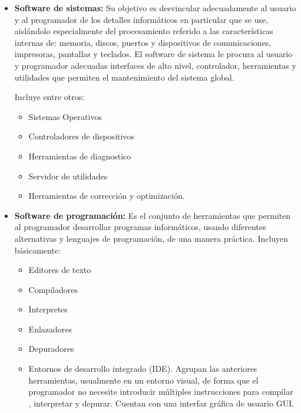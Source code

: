 \documentclass[12pt]{book} %
\begin{document}
	
		\begin{itemize}
			\item \textbf{Software de sistemas:} Su objetivo es desvincular adecuadamente al usuario y al programador de los detalles
			informáticos en particular que se use, aislándolo especialmente del procesamiento referido a las características internas de:
			memoria, discos, puertos y dispositivos de comunicaciones, impresoras, pantallas y teclados. El software de sistema le procura
			al usuario y programador adecuadas interfaces de alto nivel, controlador, herramientas y utilidades que permiten el 
			mantenimiento del sistema global. 
			
			Incluye entre otros:
			\begin{multicols}{2}
				\begin{itemize}
					\item Sistemas Operativos
					\item Controladores de dispositivos
					\item Herramientas de diagnostico
					\item Servidor de utilidades
					\item Herramientas de corrección y optimización.
				\end{itemize}
			\end{multicols}
			
			\item \textbf{Software de programación:} Es el conjunto de herramientas que permiten al programador desarrollar programas
			informáticos, usando diferentes alternativas y lenguajes de programación, de una manera práctica. Incluyen básicamente:
			\begin{multicols}{2}
				\begin{itemize}
					\item Editores de texto
					\item Compiladores
					\item Interpretes
					\item Enlazadores
					\item Depuradores
				\end{itemize}
			\end{multicols}
			\begin{itemize}
				\item Entornos de desarrollo integrado (\textsc{IDE}). Agrupan las anteriores herramientas, usualmente en un entorno
				visual, de forma que el programador no necesite introducir múltiples instrucciones para compilar , interpretar y depurar.
				Cuentan con una interfaz gráfica de usuario \textsc{GUI}.
			\end{itemize}
			

\end{itemize}
\end{document}
